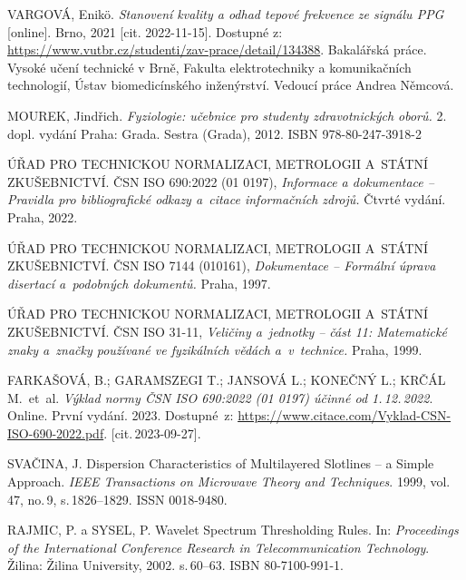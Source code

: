 

\begin{thebibliography}{99}

	VARGOVÁ, Enikö.
	\emph{Stanovení kvality a odhad tepové frekvence ze signálu PPG} [online].
	Brno, 2021 [cit. 2022-11-15].
	Dostupné z: \url{https://www.vutbr.cz/studenti/zav-prace/detail/134388}.
	Bakalářská práce. Vysoké učení technické v Brně, Fakulta elektrotechniky a komunikačních technologií, Ústav biomedicínského inženýrství.
	Vedoucí práce Andrea Němcová.
	
	MOUREK, Jindřich.
	\emph{Fyziologie: učebnice pro studenty zdravotnických oborů.}
	2.\, dopl. vydání Praha: Grada. Sestra (Grada), 2012.
	ISBN 978-80-247-3918-2

	ÚŘAD PRO TECHNICKOU NORMALIZACI, METROLOGII A~STÁTNÍ ZKUŠEBNICTVÍ.
	ČSN ISO 690:2022 (01 0197), \emph{Informace a dokumentace -- Pravidla pro bibliografické odkazy a~citace informačních zdrojů.}
	Čtvrté vydání. Praha, 2022.

	ÚŘAD PRO TECHNICKOU NORMALIZACI, METROLOGII A~STÁTNÍ ZKUŠEBNICTVÍ.
	ČSN ISO 7144 (010161), \emph{Dokumentace -- Formální úprava disertací a~podobných dokumentů.}
	Praha, 1997.

	ÚŘAD PRO TECHNICKOU NORMALIZACI, METROLOGII A~STÁTNÍ ZKUŠEBNICTVÍ.
	ČSN ISO 31-11, \emph{Veličiny a~jednotky -- část 11: Matematické znaky a~značky používané ve fyzikálních vědách a~v~technice.}
	Praha, 1999.

	FARKAŠOVÁ, B.; GARAMSZEGI T.; JANSOVÁ L.; KONEČNÝ L.; KRČÁL M.\ et~al.
	\emph{Výklad normy ČSN ISO 690:2022 (01 0197) účinné od 1.\,12.\,2022}.
	 Online. První vydání. 2023.
	Dostupné~z:
	\url{https://www.citace.com/Vyklad-CSN-ISO-690-2022.pdf}.
	[cit.\,2023-09-27].

	SVAČINA, J.
	Dispersion Characteristics of Multilayered Slotlines -- a Simple Approach.
	\emph{IEEE Transactions on Microwave Theory and Techniques}.
	1999, vol.\,47, no.\,9, s.\,1826--1829. ISSN 0018-9480.

	RAJMIC, P. a SYSEL, P.
	Wavelet Spectrum Thresholding Rules.
	In: \emph{Proceedings of the International Conference Research in Telecommunication Technology}.
	Žilina: Žilina University, 2002. s.\,60--63. ISBN 80-7100-991-1.

\end{thebibliography}


